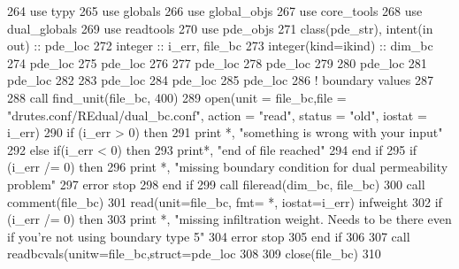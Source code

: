 \begin{DoxyCode}
264       \textcolor{keywordtype}{use }typy
265       \textcolor{keywordtype}{use }globals
266       \textcolor{keywordtype}{use }global_objs
267       \textcolor{keywordtype}{use }core_tools
268       \textcolor{keywordtype}{use }dual_globals
269       \textcolor{keywordtype}{use }readtools
270       \textcolor{keywordtype}{use }pde_objs
271       \textcolor{keywordtype}{class}(pde_str), \textcolor{keywordtype}{intent(in out)} :: pde\_loc
272       \textcolor{keywordtype}{integer} :: i\_err, file\_bc
273       \textcolor{keywordtype}{integer(kind=ikind)} :: dim\_bc
274       pde\_loc%
275       pde\_loc%
276 
277       pde\_loc%
278       pde\_loc%
279 
280       pde\_loc%
281       pde\_loc%
282 
283       pde\_loc%
284       pde\_loc%
285       pde\_loc%
286     \textcolor{comment}{! boundary values}
287     
288             \textcolor{keyword}{call }find_unit(file\_bc, 400)
289       \textcolor{keyword}{open}(unit = file\_bc,file = \textcolor{stringliteral}{"drutes.conf/REdual/dual\_bc.conf"}, action\textcolor{comment}{ = }\textcolor{stringliteral}{"read"}\textcolor{comment}{, status = }\textcolor{stringliteral}{"old"}\textcolor{comment}{, iostat
       = i\_err)}
290 \textcolor{comment}{      }\textcolor{keywordflow}{if} (i\_err > 0) \textcolor{keywordflow}{then}
291         print *, \textcolor{stringliteral}{"something is wrong with your input"}
292       \textcolor{keywordflow}{else} \textcolor{keywordflow}{if}(i\_err < 0) \textcolor{keywordflow}{then}
293         print*, \textcolor{stringliteral}{"end of file reached"}
294 \textcolor{keywordflow}{      end if} 
295       \textcolor{keywordflow}{if} (i\_err /= 0) \textcolor{keywordflow}{then}
296         print *, \textcolor{stringliteral}{"missing boundary condition for dual permeability problem"}
297         error stop
298 \textcolor{keywordflow}{      end if}  
299       \textcolor{keyword}{call }fileread(dim\_bc, file\_bc)
300       \textcolor{keyword}{call }comment(file\_bc)
301       \textcolor{keyword}{read}(unit=file\_bc, fmt= *, iostat=i\_err) infweight
302       \textcolor{keywordflow}{if} (i\_err /= 0) \textcolor{keywordflow}{then}
303         print *, \textcolor{stringliteral}{"missing infiltration weight. Needs to be there even if you're not using boundary type 5"}
304         error stop
305 \textcolor{keywordflow}{      end if} 
306       
307       \textcolor{keyword}{call }readbcvals(unitw=file\_bc,struct=pde\_loc%
308 \textcolor{comment}{}
309 \textcolor{comment}{      }\textcolor{keyword}{close}(file\_bc)
310       
\end{DoxyCode}



